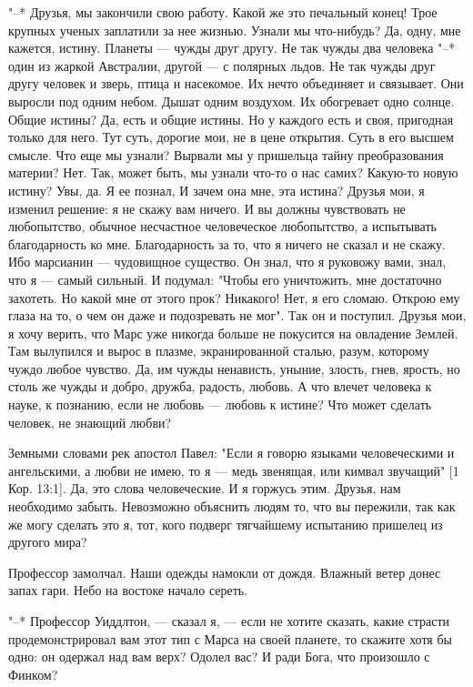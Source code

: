 "--* Друзья, мы закончили свою работу. Какой же это печальный конец!  Трое
крупных ученых заплатили за нее жизнью. Узнали мы  что-нибудь?  Да,  одну,
мне кажется, истину. Планеты --- чужды друг другу. Не так чужды два человека
"--* один из жаркой Австралии, другой --- с полярных льдов. Не так  чужды  друг
другу человек и зверь, птица и насекомое. Их нечто объединяет и связывает.
Они выросли под одним небом. Дышат  одним  воздухом.  Их  обогревает  одно
солнце. Общие истины? Да, есть и общие истины. Но у каждого есть  и  своя,
пригодная только для него. Тут суть, дорогие мои, не в цене открытия. Суть
в его высшем смысле. Что еще мы  узнали?  Вырвали  мы  у  пришельца  тайну
преобразования материи? Нет. Так, может  быть,  мы  узнали  что-то  о  нас
самих? Какую-то новую истину? Увы, да. Я ее познал, И зачем она  мне,  эта
истина? Друзья мои, я изменил решение: я не скажу вам ничего. И вы  должны
чувствовать не любопытство, обычное несчастное человеческое любопытство, а
испытывать благодарность ко мне. Благодарность за  то,  что  я  ничего  не
сказал и не скажу. Ибо марсианин --- чудовищное существо.  Он  знал,  что  я
руковожу вами, знал,  что  я  ---  самый  сильный.  И  подумал:  "Чтобы  его
уничтожить, мне достаточно захотеть. Но какой мне от этого прок? Никакого!
Нет, я его сломаю. Открою ему глаза на то, о чем он даже и подозревать  не
мог". Так он и поступил. Друзья мои, я хочу верить, что Марс  уже  никогда
больше не покусится на овладение Землей. Там вылупился и вырос  в  плазме,
экранированной сталью, разум, которому чуждо любое чувство. Да,  им  чужды
ненависть, уныние, злость, гнев,  ярость,  но  столь  же  чужды  и  добро,
дружба, радость, любовь. А что влечет человека к науке, к  познанию,  если
не любовь --- любовь к истине? Что может сделать человек, не знающий любви?

Земными словами рек апостол Павел: "Если я говорю языками человеческими
и ангельскими, а любви не имею, то я --- медь звенящая, или кимвал звучащий"
[1 Кор. 13:1]. Да, это слова человеческие. И я горжусь этим.  Друзья,  нам
необходимо забыть. Невозможно объяснить людям то, что вы пережили, так как
же могу сделать это я, тот, кого подверг тягчайшему испытанию пришелец  из
другого мира?

Профессор замолчал. Наши одежды намокли от дождя. Влажный  ветер  донес
запах гари. Небо на востоке начало сереть.

"--* Профессор Уиддлтон, --- сказал я,  ---  если  не  хотите  сказать,  какие
страсти продемонстрировал вам этот  тип  с  Марса  на  своей  планете,  то
скажите хотя бы одно: он одержал над вам верх? Одолел вас?  И  ради  Бога,
что произошло с Финком?

